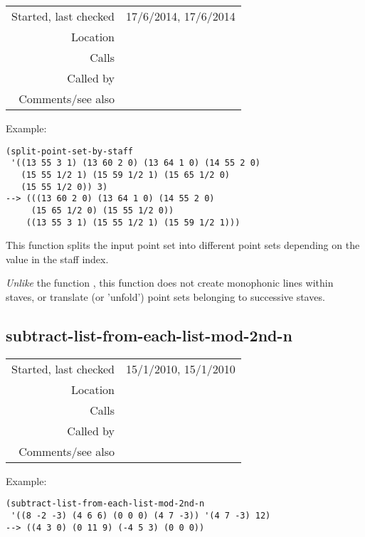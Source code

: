 \vspace{0.3cm}
\begin{tabular}{r|p{8cm}}
Started, last checked & 17/6/2014, 17/6/2014 \\
Location & \nameref{sec:structural-induction-mod} \\
Calls & \nameref{fun:dataset-restricted-to-m-in-nth} \\
Called by & \nameref{fun:melodic-interval-of-a} \\
Comments/see also &
\end{tabular}

\vspace{0.5cm}
\noindent Example:
\begin{verbatim}
(split-point-set-by-staff
 '((13 55 3 1) (13 60 2 0) (13 64 1 0) (14 55 2 0)
   (15 55 1/2 1) (15 59 1/2 1) (15 65 1/2 0)
   (15 55 1/2 0)) 3)
--> (((13 60 2 0) (13 64 1 0) (14 55 2 0)
     (15 65 1/2 0) (15 55 1/2 0))
    ((13 55 3 1) (15 55 1/2 1) (15 59 1/2 1)))
\end{verbatim}

\noindent This function splits the input point set
into different point sets depending on the value in
the staff index.

\emph{Unlike} the function ,
this function does not create monophonic lines within
staves, or translate (or 'unfold') point sets
belonging to successive staves.


\subsection*{subtract-list-from-each-list-mod-2nd-n}\label{fun:subtract-list-from-each-list-mod-2nd-n}

\vspace{0.3cm}
\begin{tabular}{r|p{8cm}}
Started, last checked & 15/1/2010, 15/1/2010 \\
Location & \nameref{sec:structural-induction-mod} \\
Calls & \nameref{fun:subtract-two-lists-mod-2nd-n} \\
Called by & \nameref{fun:translators-of-pattern-in-dataset-mod-2nd-n} \\
Comments/see also & \nameref{fun:subtract-list-from-each-list}
\end{tabular}

\vspace{0.5cm}
\noindent Example:
\begin{verbatim}
(subtract-list-from-each-list-mod-2nd-n
 '((8 -2 -3) (4 6 6) (0 0 0) (4 7 -3)) '(4 7 -3) 12)
--> ((4 3 0) (0 11 9) (-4 5 3) (0 0 0))
\end{verbatim}

